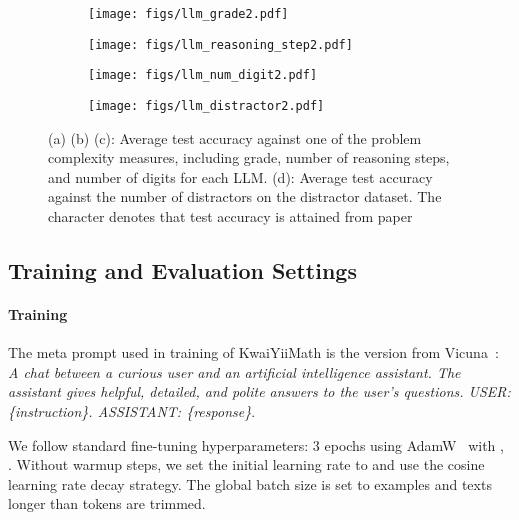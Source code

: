 \documentclass{article}
\begin{document}
\begin{figure}[!t]
    \centering
    \begin{subfigure}[b]{0.45\textwidth}
     \texttt{[image: figs/llm\_grade2.pdf]}
     \caption{}
     \label{subgraph:a}
    \end{subfigure}
\hspace{-2mm}
    \begin{subfigure}[b]{0.45\textwidth}
     \texttt{[image: figs/llm\_reasoning\_step2.pdf]}
     \caption{}
     \label{subgraph:b}
    \end{subfigure}

    \begin{subfigure}[b]{0.45\textwidth}
     \texttt{[image: figs/llm\_num\_digit2.pdf]}
     \caption{}
     \label{subgraph:c}
    \end{subfigure}
\hspace{-2mm}
    \begin{subfigure}[b]{0.45\textwidth}
     \texttt{[image: figs/llm\_distractor2.pdf]}
     \caption{}
     \label{subgraph:d}
    \end{subfigure}

    \caption{(a) (b) (c): Average test accuracy against one of the problem complexity measures, including 
    grade, number of reasoning steps, and number of digits for each LLM. (d): Average test accuracy against the number of distractors on the distractor dataset. The character  denotes that test accuracy is attained from paper~\cite{wei2023cmath} }
    \label{fig:figperformance}
\end{figure}
\subsection{Training and Evaluation Settings}
\paragraph{Training}
The meta prompt used in training of KwaiYiiMath is the version from Vicuna~\cite{vicuna2023}:
\textit{A chat between a curious user and an artificial intelligence assistant. The assistant gives helpful, detailed, and polite answers to the user's questions. USER: \{instruction\}. ASSISTANT: \{response\}}.

We follow standard fine-tuning hyperparameters: 3 epochs using AdamW~\cite{loshchilov2017decoupled} with , .
Without warmup steps, we set the initial learning rate to  and use the cosine learning rate decay strategy. 
The global batch size is set to  examples and texts longer than  tokens are trimmed.
\end{document}
